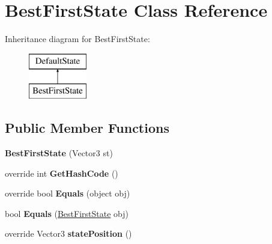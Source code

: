 \hypertarget{class_best_first_state}{\section{Best\-First\-State Class Reference}
\label{class_best_first_state}
}
Inheritance diagram for Best\-First\-State\-:\begin{figure}[H]
\begin{center}
\leavevmode
\includegraphics[height=2.000000cm]{class_best_first_state}
\end{center}
\end{figure}
\subsection*{Public Member Functions}
\begin{DoxyCompactItemize}
\item 
\hypertarget{class_best_first_state_a0704eec1c8b220625518dd2089247608}{{\bfseries Best\-First\-State} (Vector3 st)}\label{class_best_first_state_a0704eec1c8b220625518dd2089247608}

\item 
\hypertarget{class_best_first_state_a3353f52b010a1c812b28f58134a3c7bb}{override int {\bfseries Get\-Hash\-Code} ()}\label{class_best_first_state_a3353f52b010a1c812b28f58134a3c7bb}

\item 
\hypertarget{class_best_first_state_a286520962ee94165281a2a8f348761ce}{override bool {\bfseries Equals} (object obj)}\label{class_best_first_state_a286520962ee94165281a2a8f348761ce}

\item 
\hypertarget{class_best_first_state_aeecb81a2451e5b056a7a4b1cf4c2bbee}{bool {\bfseries Equals} (\hyperlink{class_best_first_state}{Best\-First\-State} obj)}\label{class_best_first_state_aeecb81a2451e5b056a7a4b1cf4c2bbee}

\item 
\hypertarget{class_best_first_state_a3d992e4922c88ef7d34b41598ac888a8}{override Vector3 {\bfseries state\-Position} ()}\label{class_best_first_state_a3d992e4922c88ef7d34b41598ac888a8}

\end{DoxyCompactItemize}
